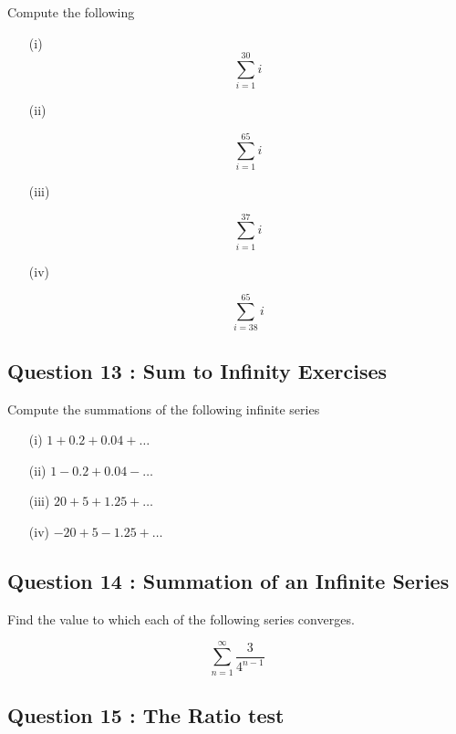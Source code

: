 \documentclass[]{article}
\begin{document}
\noindent Compute the following 

\begin{multicols}{2}
	\begin{itemize}
		
		
		\item[(i)]	\[ \sum_{i=1}^{30} i \]
		\item[(ii)]  
		
		\[ \sum_{i=1}^{65} i \]
		
		\item [(iii)] 
		
		\[ \sum_{i=1}^{37} i \]
		
		
		\item [(iv)] 
		
		\[ \sum_{i=38}^{65} i \]
		
	\end{itemize}
\end{multicols}




\subsection*{Question 13 : Sum to Infinity Exercises}
Compute the summations of the following infinite series
\begin{multicols}{2}
	\begin{itemize}
		\item[(i)] $1 + 0.2 + 0.04 + \ldots$
		\item[(ii)] $1 - 0.2 + 0.04 - \ldots$
		
		\item[(iii)] $20 + 5 + 1.25 + \ldots$
		\item[(iv)] $- 20 + 5 - 1.25 + \ldots$
	\end{itemize} 
\end{multicols}
\bigskip
\subsection*{Question 14 : Summation of an Infinite Series}

Find the value to which each of the following series converges.

\[\sum_{n=1}^{\infty} \frac{3}{4^{n-1}}\]

	\subsection*{Question 15 : The Ratio test}
\end{document}
